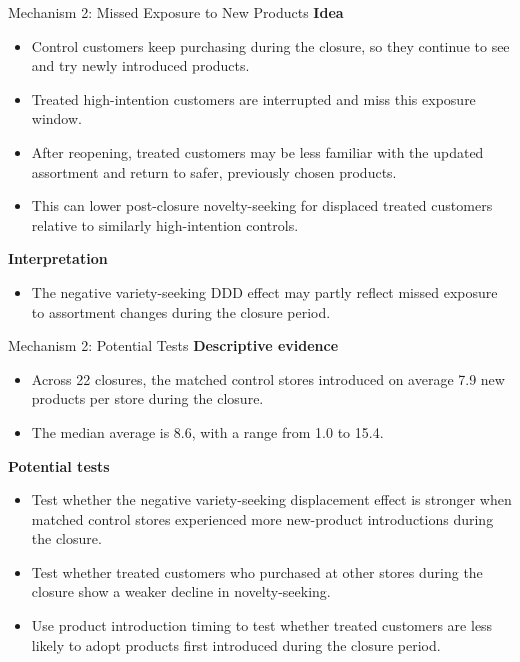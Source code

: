 \documentclass[aspectratio=169]{beamer}  %
\begin{document}
\begin{frame}{Mechanism 2: Missed Exposure to New Products}
\footnotesize
\textbf{Idea}
\begin{itemize}
    \item Control customers keep purchasing during the closure, so they continue to see and try newly introduced products.
    \item Treated high-intention customers are interrupted and miss this exposure window.
    \item After reopening, treated customers may be less familiar with the updated assortment and return to safer, previously chosen products.
    \item This can lower post-closure novelty-seeking for displaced treated customers relative to similarly high-intention controls.
\end{itemize}

\textbf{Interpretation}
\begin{itemize}
    \item The negative variety-seeking DDD effect may partly reflect missed exposure to assortment changes during the closure period.
\end{itemize}
\end{frame}

\begin{frame}{Mechanism 2: Potential Tests}
\footnotesize
\textbf{Descriptive evidence}
\begin{itemize}
    \item Across 22 closures, the matched control stores introduced on average 7.9 new products per store during the closure.
    \item The median average is 8.6, with a range from 1.0 to 15.4.
\end{itemize}

\textbf{Potential tests}
\begin{itemize}
    \item Test whether the negative variety-seeking displacement effect is stronger when matched control stores experienced more new-product introductions during the closure.
    \item Test whether treated customers who purchased at other stores during the closure show a weaker decline in novelty-seeking.
    \item Use product introduction timing to test whether treated customers are less likely to adopt products first introduced during the closure period.
\end{itemize}
\end{frame}
\end{document}
